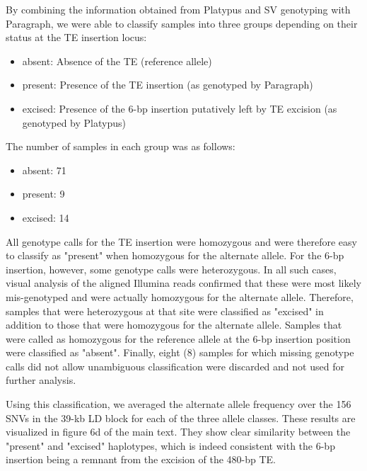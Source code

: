 \documentclass[12pt]{article}
\begin{document}
By combining the information obtained from Platypus and SV genotyping with Paragraph, we were able to classify samples into three groups depending on their status at the TE insertion locus:

\begin{itemize}
	\item absent: Absence of the TE (reference allele)
	\item present: Presence of the TE insertion (as genotyped by Paragraph)
	\item excised: Presence of the 6-bp insertion putatively left by TE excision (as genotyped by Platypus)
\end{itemize}

The number of samples in each group was as follows:

\begin{itemize}
	\item absent: 71 
	\item present: 9
	\item excised: 14
\end{itemize}

All genotype calls for the TE insertion were homozygous and were therefore easy to classify as "present" when homozygous for the alternate allele.
For the 6-bp insertion, however, some genotype calls were heterozygous. 
In all such cases, visual analysis of the aligned Illumina reads confirmed that these were most likely mis-genotyped and were actually homozygous for the alternate allele.
Therefore, samples that were heterozygous at that site were classified as "excised" in addition to those that were homozygous for the alternate allele.
Samples that were called as homozygous for the reference allele at the 6-bp insertion position were classified as "absent".
Finally, eight (8) samples for which missing genotype calls did not allow unambiguous classification were discarded and not used for further analysis.

Using this classification, we averaged the alternate allele frequency over the 156 SNVs in the 39-kb LD block for each of the three allele classes.
These results are visualized in figure 6d of the main text.
They show clear similarity between the "present" and "excised" haplotypes, which is indeed consistent with the 6-bp insertion being a remnant from the excision of the 480-bp TE.

\clearpage
\end{document}
